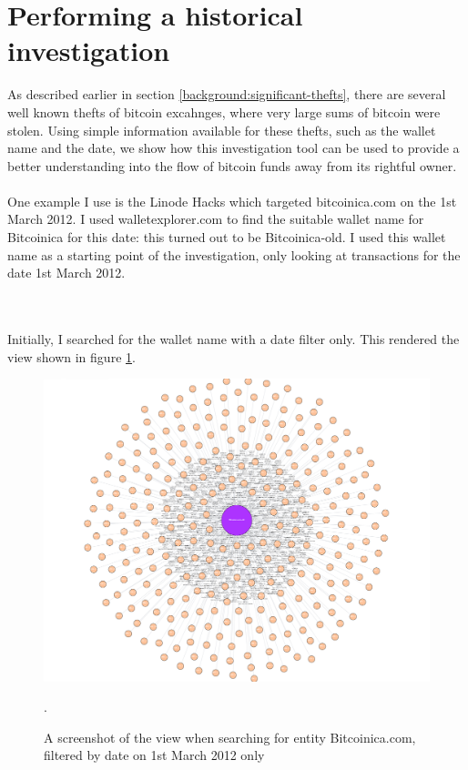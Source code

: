 \section{Performing a historical investigation}
As described earlier in section \ref{background:significant-thefts}, there are several well known thefts of bitcoin excahnges, where very large sums of bitcoin were stolen. Using simple information available for these thefts, such as the wallet name and the date, we show how this investigation tool can be used to provide a better understanding into the flow of bitcoin funds away from its rightful owner.
\\\\
One example I use is the Linode Hacks which targeted bitcoinica.com on the 1st March 2012. I used walletexplorer.com to find the suitable wallet name for Bitcoinica for this date: this turned out to be Bitcoinica-old. I used this wallet name as a starting point of the investigation, only looking at transactions for the date 1st March 2012. 


\\\\
Initially, I searched for the wallet name with a date filter only. This rendered the view shown in figure \ref{fig:theft-no-filter}.

\begin{figure}[h!]
  \centering
  \includegraphics[width = 15cm]{./figures/theft-all-txs-1st-march}\\[0.5cm]
  \caption{A screenshot of the view when searching for entity Bitcoinica.com, filtered by date on 1st March 2012 only}.
  \label{fig:theft-no-filter}
\end{figure}

